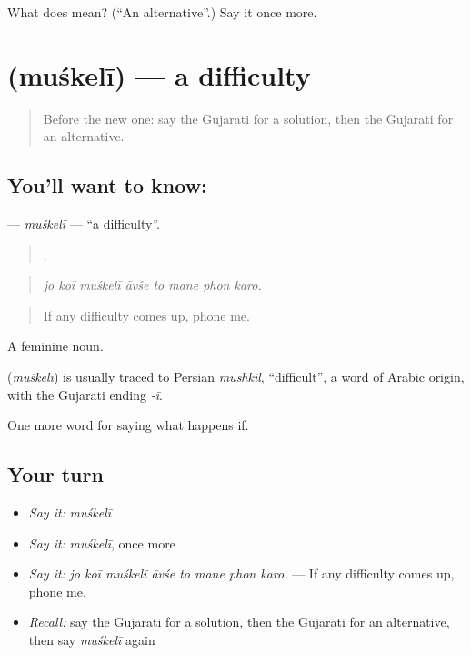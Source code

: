 \begin{tcolorbox}[breakable,colback=teal!4,colframe=teal!35!black,title={Before you move on}]
What does  mean? (\textquotedblleft{}An alternative\textquotedblright{}.) Say it once more.
\end{tcolorbox}
\section[\texorpdfstring{\gu{મુશ્કેલી} (muśkelī)}{મુશ્કેલી (muśkelī)}]{ (muśkelī) — a difficulty}

\label{lesson:GU-C373-muskeli}



\begin{quote}
Before the new one: say the Gujarati for a solution, then the Gujarati for an alternative.
\end{quote}

\subsection*{You'll want to know: }
\textbf{} — \emph{muśkelī} — \textquotedblleft{}a difficulty\textquotedblright{}.

\begin{quote}
       .
\end{quote}

\begin{quote}
\emph{jo koī muśkelī āvśe to mane phon karo.}
\end{quote}

\begin{quote}
If any difficulty comes up, phone me.
\end{quote}

A feminine noun.

\begin{cousinweb}
\textbf{} (\emph{muśkelī}) is usually traced to Persian \emph{mushkil}, \textquotedblleft{}difficult\textquotedblright{}, a word of Arabic origin, with the Gujarati ending \emph{-ī}.
\end{cousinweb}

\begin{grammarlens}[title={What you've built}]
One more word for saying what happens if.
\end{grammarlens}

\subsection*{Your turn}
\begin{itemize}
\raggedright
  \item \emph{Say it:} \emph{muśkelī}
  \item \emph{Say it:} \emph{muśkelī}, once more
  \item \emph{Say it:} \emph{jo koī muśkelī āvśe to mane phon karo.} — If any difficulty comes up, phone me.
  \item \emph{Recall:} say the Gujarati for a solution, then the Gujarati for an alternative, then say \emph{muśkelī} again
\end{itemize}

